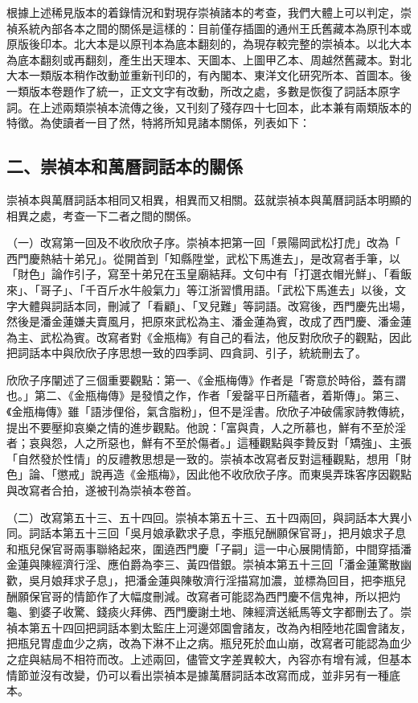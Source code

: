 根據上述稀見版本的着錄情況和對現存崇禎諸本的考查，我們大體上可以判定，崇禎系統內部各本之間的關係是這樣的：目前僅存插圖的通州王氏舊藏本為原刊本或原版後印本。北大本是以原刊本為底本翻刻的，為現存較完整的崇禎本。以北大本為底本翻刻或再翻刻，產生出天理本、天圖本、上圖甲乙本、周越然舊藏本。對北大本一類版本稍作改動並重新刊印的，有內閣本、東洋文化研究所本、首圖本。後一類版本卷題作了統一，正文文字有改動，所改之處，多數是恢復了詞話本原字詞。在上述兩類崇禎本流傳之後，又刊刻了殘存四十七回本，此本兼有兩類版本的特徵。為使讀者一目了然，特將所知見諸本關係，列表如下：
{\clearpage}


\subsection*{二、崇禎本和萬曆詞話本的關係}

崇禎本與萬曆詞話本相同又相異，相異而又相關。茲就崇禎本與萬曆詞話本明顯的相異之處，考查一下二者之間的關係。

（一）改寫第一回及不收欣欣子序。崇禎本把第一回「景陽岡武松打虎」改為「 西門慶熱結十弟兄」。從開首到「知縣陞堂，武松下馬進去」，是改寫者手筆，以 「財色」論作引子，寫至十弟兄在玉皇廟結拜。文句中有「打選衣帽光鮮」、「看飯來」、「哥子」、「千百斤水牛般氣力」等江浙習慣用語。「武松下馬進去」以後，文字大體與詞話本同，刪減了「看顧」、「叉兒難」等詞語。改寫後，西門慶先出場，然後是潘金蓮嫌夫賣風月，把原來武松為主、潘金蓮為賓，改成了西門慶、潘金蓮為主、武松為賓。改寫者對《金瓶梅》有自己的看法，他反對欣欣子的觀點，因此把詞話本中與欣欣子序思想一致的四季詞、四貪詞、引子，統統刪去了。

欣欣子序闡述了三個重要觀點：第一、《金瓶梅傳》作者是「寄意於時俗，蓋有謂也。」第二、《金瓶梅傳》是發憤之作，作者「爰罄平日所蘊者，着斯傳」。第三、《金瓶梅傳》雖「語涉俚俗，氣含脂粉」，但不是淫書。欣欣子冲破儒家詩教傳統，提出不要壓抑哀樂之情的進步觀點。他說：「富與貴，人之所慕也，鮮有不至於淫者；哀與怨，人之所惡也，鮮有不至於傷者。」這種觀點與李贄反對「矯強」、主張「自然發於性情」的反禮教思想是一致的。崇禎本改寫者反對這種觀點，想用「財色」論、「懲戒」說再造《金瓶梅》，因此他不收欣欣子序。而東吳弄珠客序因觀點與改寫者合拍，遂被刊為崇禎本卷首。

（二）改寫第五十三、五十四回。崇禎本第五十三、五十四兩回，與詞話本大異小同。詞話本第五十三回「吳月娘承歡求子息，李瓶兒酬願保官哥」，把月娘求子息和瓶兒保官哥兩事聯絡起來，圍遶西門慶「子嗣」這一中心展開情節，中間穿插潘金蓮與陳經濟行淫、應伯爵為李三、黃四借銀。崇禎本第五十三回「潘金蓮驚散幽歡，吳月娘拜求子息」，把潘金蓮與陳敬濟行淫描寫加濃，並標為回目，把李瓶兒酬願保官哥的情節作了大幅度刪減。改寫者可能認為西門慶不信鬼神，所以把灼龜、劉婆子收驚、錢痰火拜佛、西門慶謝土地、陳經濟送紙馬等文字都刪去了。崇禎本第五十四回把詞話本劉太監庄上河邊郊園會諸友，改為內相陸地花園會諸友，把瓶兒胃虛血少之病，改為下淋不止之病。瓶兒死於血山崩，改寫者可能認為血少之症與結局不相符而改。上述兩回，儘管文字差異較大，內容亦有增有減，但基本情節並沒有改變，仍可以看出崇禎本是據萬曆詞話本改寫而成，並非另有一種底本。

